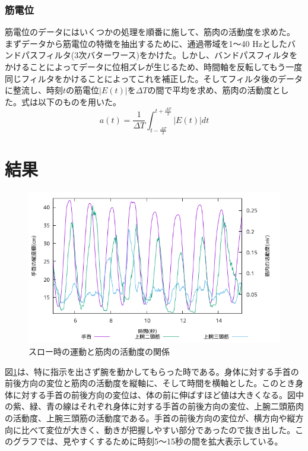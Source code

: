 \documentclass{jsarticle}
\begin{document}
\subsubsection{筋電位}
筋電位のデータにはいくつかの処理を順番に施して、筋肉の活動度を求めた。
  まずデータから筋電位の特徴を抽出するために、通過帯域を1〜40 Hzとしたバンドパスフィルタ(3次バターワース)をかけた。しかし、バンドパスフィルタをかけることによってデータに位相ズレが生じるため、時間軸を反転してもう一度同じフィルタをかけることによってこれを補正した。そしてフィルタ後のデータに整流し、時刻$t$の筋電位$|E(t)|$を$\Delta T$の間で平均を求め、筋肉の活動度とした。式は以下のものを用いた。
  \begin{equation}
    a(t) = \frac{1}{\Delta T} \int_{t-\frac{\Delta T}{2}}^{t+\frac{\Delta T}{2}} |E(t)| dt
  \end{equation}

\section{結果}
\begin{figure}[h]
  \begin{center}
    \includegraphics[width=15cm]{images/s1proto.png}
  \end{center}
  \caption{スロー時の運動と筋肉の活動度の関係}
  \label{fig:slow}
\end{figure}
図\ref{fig:slow}は、特に指示を出さず腕を動かしてもらった時である。身体に対する手首の前後方向の変位と筋肉の活動度を縦軸に、そして時間を横軸とした。このとき身体に対する手首の前後方向の変位は、体の前に伸ばすほど値は大きくなる。図中の紫、緑、青の線はそれぞれ身体に対する手首の前後方向の変位、上腕二頭筋肉の活動度、上腕三頭筋の活動度である。手首の前後方向の変位が、横方向や縦方向に比べて変位が大きく、動きが把握しやすい部分であったので抜き出した。このグラフでは、見やすくするために時刻5〜15秒の間を拡大表示している。
\end{document}
